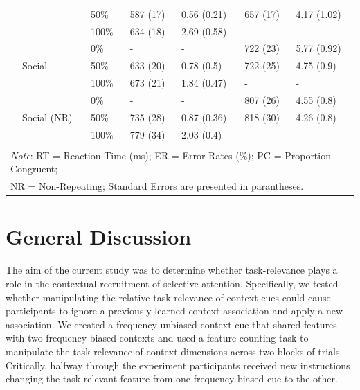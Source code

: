 \documentclass[]{DissertateCUNY}
\begin{document}
\begin{table}[htbp]
\begin{tabular}{lllcccc}
& & \multicolumn{1}{l}{50\%} & \multicolumn{1}{l}{587 (17)} & \multicolumn{1}{l}{0.56 (0.21)} & \multicolumn{1}{l}{657 (17)} & \multicolumn{1}{l}{4.17 (1.02)} \\
& & \multicolumn{1}{l}{100\%} & \multicolumn{1}{l}{634 (18)} & \multicolumn{1}{l}{2.69 (0.58)} & \multicolumn{1}{l}{-} & \multicolumn{1}{l}{-} \\
\cmidrule(rl){2-7}
& \multirow{3}{*}{Social} & \multicolumn{1}{l}{0\%} & \multicolumn{1}{l}{-} & \multicolumn{1}{l}{-} & \multicolumn{1}{l}{722 (23)} & \multicolumn{1}{l}{5.77 (0.92)} \\
& & \multicolumn{1}{l}{50\%} & \multicolumn{1}{l}{633 (20)} & \multicolumn{1}{l}{0.78 (0.5)} & \multicolumn{1}{l}{722 (25)} & \multicolumn{1}{l}{4.75 (0.9)} \\
& & \multicolumn{1}{l}{100\%} & \multicolumn{1}{l}{673 (21)} & \multicolumn{1}{l}{1.84 (0.47)} & \multicolumn{1}{l}{-} & \multicolumn{1}{l}{-} \\
\cmidrule(rl){2-7}
& \multirow{3}{*}{Social (NR)} & \multicolumn{1}{l}{0\%} & \multicolumn{1}{l}{-} & \multicolumn{1}{l}{-} & \multicolumn{1}{l}{807 (26)} & \multicolumn{1}{l}{4.55 (0.8)} \\
& & \multicolumn{1}{l}{50\%} & \multicolumn{1}{l}{735 (28)} & \multicolumn{1}{l}{0.87 (0.36)} & \multicolumn{1}{l}{818 (30)} & \multicolumn{1}{l}{4.26 (0.8)} \\
& & \multicolumn{1}{l}{100\%} & \multicolumn{1}{l}{779 (34)} & \multicolumn{1}{l}{2.03 (0.4)} & \multicolumn{1}{l}{-} & \multicolumn{1}{l}{-} \\
 & & & & & & \\
\bottomrule
\multicolumn{7}{l}{\textit{Note}: RT = Reaction Time (ms);  ER = Error Rates (\%); PC = Proportion Congruent;} \\
\multicolumn{7}{l}{NR = Non-Repeating; Standard Errors are presented in parantheses.} \\
\end{tabular}%
\end{table}

\hypertarget{general-discussion-2}{%
\section{General Discussion}\label{general-discussion-2}}

The aim of the current study was to determine whether task-relevance
plays a role in the contextual recruitment of selective attention.
Specifically, we tested whether manipulating the relative task-relevance
of context cues could cause participants to ignore a previously learned
context-association and apply a new association. We created a frequency
unbiased context cue that shared features with two frequency biased
contexts and used a feature-counting task to manipulate the
task-relevance of context dimensions across two blocks of trials.
Critically, halfway through the experiment participants received new
instructions changing the task-relevant feature from one frequency
biased cue to the other.
\end{document}
